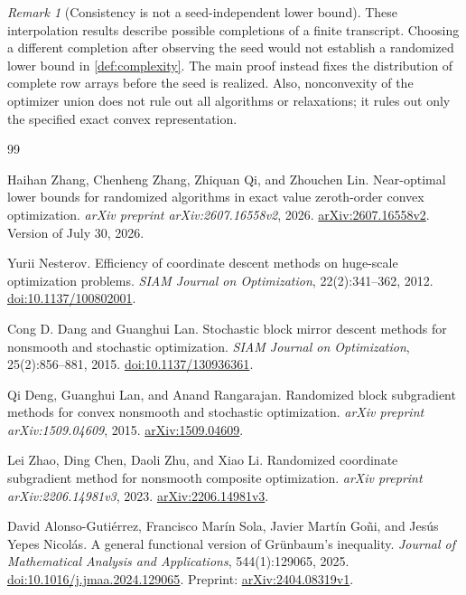 \documentclass[11pt]{article}
\numberwithin{equation}{section}
\theoremstyle{definition}
\theoremstyle{remark}
\newtheorem{remark}[remark]{Remark}
\begin{document}
\begin{remark}[Consistency is not a seed-independent lower bound]
These interpolation results describe possible completions of a finite transcript. Choosing a different completion after observing the seed would not establish a randomized lower bound in \cref{def:complexity}. The main proof instead fixes the distribution of complete row arrays before the seed is realized. Also, nonconvexity of the optimizer union does not rule out all algorithms or relaxations; it rules out only the specified exact convex representation.
\end{remark}

\begin{thebibliography}{99}

Haihan Zhang, Chenheng Zhang, Zhiquan Qi, and Zhouchen Lin.
\newblock Near-optimal lower bounds for randomized algorithms in exact value zeroth-order convex optimization.
\newblock \emph{arXiv preprint arXiv:2607.16558v2}, 2026.
\newblock \href{https://arxiv.org/abs/2607.16558v2}{arXiv:2607.16558v2}.
\newblock Version of July 30, 2026.

Yurii Nesterov.
\newblock Efficiency of coordinate descent methods on huge-scale optimization problems.
\newblock \emph{SIAM Journal on Optimization}, 22(2):341--362, 2012.
\newblock \href{https://doi.org/10.1137/100802001}{doi:10.1137/100802001}.

Cong D. Dang and Guanghui Lan.
\newblock Stochastic block mirror descent methods for nonsmooth and stochastic optimization.
\newblock \emph{SIAM Journal on Optimization}, 25(2):856--881, 2015.
\newblock \href{https://doi.org/10.1137/130936361}{doi:10.1137/130936361}.

Qi Deng, Guanghui Lan, and Anand Rangarajan.
\newblock Randomized block subgradient methods for convex nonsmooth and stochastic optimization.
\newblock \emph{arXiv preprint arXiv:1509.04609}, 2015.
\newblock \href{https://arxiv.org/abs/1509.04609}{arXiv:1509.04609}.

Lei Zhao, Ding Chen, Daoli Zhu, and Xiao Li.
\newblock Randomized coordinate subgradient method for nonsmooth composite optimization.
\newblock \emph{arXiv preprint arXiv:2206.14981v3}, 2023.
\newblock \href{https://arxiv.org/abs/2206.14981v3}{arXiv:2206.14981v3}.

David Alonso-Guti\'errez, Francisco Mar\'in Sola, Javier Mart\'in Go\~ni, and Jes\'us Yepes Nicol\'as.
\newblock A general functional version of Gr\"unbaum's inequality.
\newblock \emph{Journal of Mathematical Analysis and Applications}, 544(1):129065, 2025.
\newblock \href{https://doi.org/10.1016/j.jmaa.2024.129065}{doi:10.1016/j.jmaa.2024.129065}.
\newblock Preprint: \href{https://arxiv.org/abs/2404.08319v1}{arXiv:2404.08319v1}.


\end{thebibliography}
\end{document}
